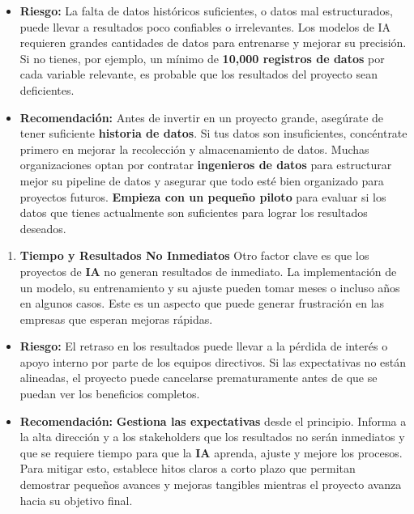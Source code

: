 \documentclass[
  10pt,
  letterpaper,
]{book}
\providecommand{\tightlist}{%
  \setlength{\itemsep}{0pt}\setlength{\parskip}{0pt}}\usepackage{longtable,booktabs,array}
\begin{document}
\begin{itemize}
\item
  \textbf{Riesgo:} La falta de datos históricos suficientes, o datos mal
  estructurados, puede llevar a resultados poco confiables o
  irrelevantes. Los modelos de IA requieren grandes cantidades de datos
  para entrenarse y mejorar su precisión. Si no tienes, por ejemplo, un
  mínimo de \textbf{10,000 registros de datos} por cada variable
  relevante, es probable que los resultados del proyecto sean
  deficientes.
\item
  \textbf{Recomendación:} Antes de invertir en un proyecto grande,
  asegúrate de tener suficiente \textbf{historia de datos}. Si tus datos
  son insuficientes, concéntrate primero en mejorar la recolección y
  almacenamiento de datos. Muchas organizaciones optan por contratar
  \textbf{ingenieros de datos} para estructurar mejor su pipeline de
  datos y asegurar que todo esté bien organizado para proyectos futuros.
  \textbf{Empieza con un pequeño piloto} para evaluar si los datos que
  tienes actualmente son suficientes para lograr los resultados
  deseados.
\end{itemize}

\begin{enumerate}
\def\labelenumi{\arabic{enumi}.}
\setcounter{enumi}{2}
\tightlist
\item
  \textbf{Tiempo y Resultados No Inmediatos} Otro factor clave es que
  los proyectos de \textbf{IA} no generan resultados de inmediato. La
  implementación de un modelo, su entrenamiento y su ajuste pueden tomar
  meses o incluso años en algunos casos. Este es un aspecto que puede
  generar frustración en las empresas que esperan mejoras rápidas.
\end{enumerate}

\begin{itemize}
\item
  \textbf{Riesgo:} El retraso en los resultados puede llevar a la
  pérdida de interés o apoyo interno por parte de los equipos
  directivos. Si las expectativas no están alineadas, el proyecto puede
  cancelarse prematuramente antes de que se puedan ver los beneficios
  completos.
\item
  \textbf{Recomendación:} \textbf{Gestiona las expectativas} desde el
  principio. Informa a la alta dirección y a los stakeholders que los
  resultados no serán inmediatos y que se requiere tiempo para que la
  \textbf{IA} aprenda, ajuste y mejore los procesos. Para mitigar esto,
  establece hitos claros a corto plazo que permitan demostrar pequeños
  avances y mejoras tangibles mientras el proyecto avanza hacia su
  objetivo final.
\end{itemize}
\end{document}
